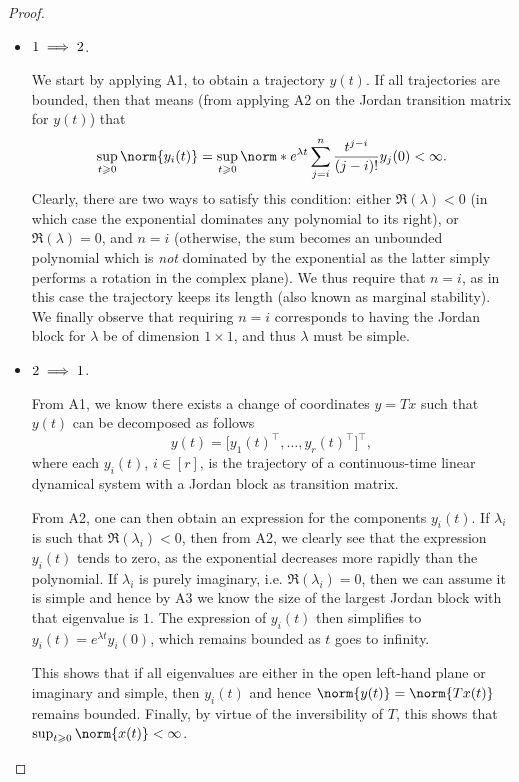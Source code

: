 \documentclass[11pt]{article}
\begin{document}
\begin{proof}\leavevmode
\begin{itemize}
	\item \(\textnormal{1} \implies \textnormal{2}\).
	
	We start by applying A1, to obtain a trajectory \(y(t)\).
	If all trajectories are bounded, then that means (from applying A2 on the Jordan transition matrix for \(y(t)\)) that
	\[
	\sup_{t \geqslant 0} \norm{y_i(t)} = \sup_{t \geqslant 0} \norm*{e^{\lambda t} \sum_{j = i}^n \frac{t^{j - i}}{(j - i)!} y_j(0)} < \infty.
	\]
	Clearly, there are two ways to satisfy this condition: either \(\Re(\lambda) < 0\) (in which case the exponential dominates any polynomial to its right), or \(\Re(\lambda) = 0\), and \(n = i\) (otherwise, the sum becomes an unbounded polynomial which is \textit{not} dominated by the exponential as the latter simply performs a rotation in the complex plane).
	We thus require that \(n = i\), as in this case the trajectory keeps its length (also known as marginal stability).
	We finally observe that requiring \(n = i\) corresponds to having the Jordan block for \(\lambda\) be of dimension \(1 \times 1\), and thus \(\lambda\) must be simple.
	\item \(\textnormal{2} \implies \textnormal{1}\).

	From A1, we know there exists a change of coordinates $y=Tx$ such that $y(t)$ can be decomposed as follows
	\[
	y(t) = \big[y_1(t)^\top, \dots, y_r(t)^\top\big]^\top,
	\]
	where each $y_i(t)$, $i \in [r]$, is the trajectory of a continuous-time linear dynamical system with a Jordan block as transition matrix.
	
	From A2, one can then obtain an expression for the components $y_i(t)$.
	If $\lambda_i$ is such that $\Re(\lambda_i)<0$, then from A2, we clearly see that the expression $y_i(t)$ tends to zero, as the exponential decreases more rapidly than the polynomial.
	If $\lambda_i$ is purely imaginary, i.e. $\Re(\lambda_i) = 0$, then we can assume it is simple and hence by A3 we know the size of the largest Jordan block with that eigenvalue is \(1\).
	The expression of $y_i(t)$ then simplifies to $y_i(t)=e^{\lambda t} y_i(0)$, which remains bounded as \(t\) goes to infinity. %
	
	This shows that if all eigenvalues are either in the open left-hand plane or imaginary and simple, then $y_i(t)$ and hence $\norm{y(t)}=\norm{Tx(t)}$ remains bounded.
	Finally, by virtue of the inversibility of \(T\), this shows that \(\sup_{t \geqslant 0} \norm{x(t)} < \infty\).\qedhere
\end{itemize}
\end{proof}
\end{document}
